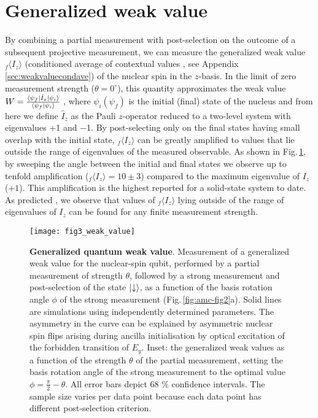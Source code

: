 \section{Generalized weak value}
By combining a partial measurement with post-selection on the outcome of a subsequent projective measurement, we can measure the generalized weak value $_{f} \langle I_{z} \rangle$ (conditioned average of contextual values \cite{Dressel_PRL_2010}, see Appendix \ref{sec:weakvaluecondave}) of the nuclear spin in the $z$-basis. In the limit of zero measurement strength ($\theta = 0^{\circ}$), this quantity approximates the weak value \cite{Aharonov_PRL_1988} $W = \frac{\left<\psi_f\right| \hat{I}_z \left|\psi_i\right>}{\left<\psi_f\right| \psi_i \rangle}$ , where $ \psi_i (\psi_f )$ is the initial (final) state of the nucleus and from here we define $\hat{I}_z$ as the Pauli $z$-operator reduced to a two-level system with eigenvalues +1 and $-$1. By post-selecting only on the final states having small overlap with the initial state, $_{f} \langle I_{z} \rangle$ can be greatly amplified to values that lie outside the range of eigenvalues of the measured observable. As shown in Fig.\,\ref{fig:amc-fig3}, by sweeping the angle between the initial and final states we observe up to tenfold amplification ($_{f} \langle I_{z} \rangle = 10 \pm 3$) compared to the maximum eigenvalue of $I_{z}$ ($+1$). This amplification is the highest reported for a solid-state system to date\cite{Groen_PRL_2013}. As predicted \cite{Williams_PRL_2008}, we observe that values of  $_{f} \langle I_{z} \rangle$ lying outside of the range of eigenvalues of $I_{z}$ can be found for any finite measurement strength.

\begin{figure}
	\centering
	\texttt{[image: fig3\_weak\_value]}
	\caption{\label{fig:amc-fig3} \textbf{Generalized quantum weak value}. Measurement of a generalized weak value for the nuclear-spin qubit, performed by a partial measurement of strength $\theta$, followed by a strong measurement and post-selection of the state  $\left|\downarrow\right>$, as a function of the basis rotation angle $\phi$ of the strong measurement (Fig.\,\ref{fig:amc-fig2}a). Solid lines are simulations using independently determined parameters. The asymmetry in the curve can be explained by asymmetric nuclear spin flips arising during ancilla initialisation by optical excitation of the forbidden transition of $E_{y}$. Inset: the generalized weak values as a function of the strength $\theta$ of the partial measurement, setting the basis rotation angle of the strong measurement to the optimal value  $\phi = \frac{\pi}{2} - \theta$. All error bars depict 68 $\%$ confidence intervals. The sample size varies per data point because each data point has different post-selection criterion.}
\end{figure}

